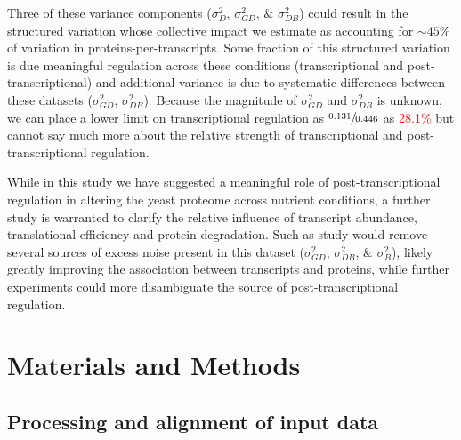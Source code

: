 Three of these variance components ($\sigma^{2}_{D}$, $\sigma^{2}_{GD}$, $\&$ $\sigma^{2}_{DB}$) could result in the structured variation whose collective impact we estimate as accounting for $\sim45\%$ of variation in proteins-per-transcripts. Some fraction of this structured variation is due meaningful regulation across these conditions (transcriptional and post-transcriptional) and additional variance is due to systematic differences between these datasets ($\sigma^{2}_{GD}$, $\sigma^{2}_{DB}$).  Because the magnitude of $\sigma^{2}_{GD}$ and $\sigma^{2}_{DB}$ is unknown, we can place a lower limit on transcriptional regulation as $\sfrac{0.131}{0.446}$ as \textcolor{red}{28.1\%} but cannot say much more about the relative strength of transcriptional and post-transcriptional regulation.

While in this study we have suggested a meaningful role of post-transcriptional regulation in altering the yeast proteome across nutrient conditions, a further study is warranted to clarify the relative influence of transcript abundance, translational efficiency and protein degradation. Such as study would remove several sources of excess noise present in this dataset ($\sigma^{2}_{GD}$, $\sigma^{2}_{DB}$, $\&$ $\sigma^{2}_{B}$), likely greatly improving the association between transcripts and proteins, while further experiments could more disambiguate the source of post-transcriptional regulation.

\section{Materials and Methods}

\subsection{Processing and alignment of input data}

